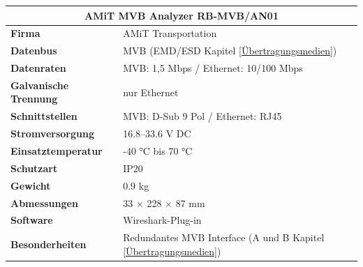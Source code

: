 \begin{minipage}{0.57\textwidth}
  \begin{tabular}{|m{3.3cm}|m{4.2cm}|}
  \hline
    \multicolumn{2}{|c|}{\textbf{AMiT MVB Analyzer RB-MVB/AN01}} \\ \hline
    \textbf{Firma} & AMiT Transportation \\ \hline
    \textbf{Datenbus} & MVB (EMD/ESD Kapitel \ref{Übertragungsmedien}) \\ \hline
    \textbf{Datenraten} & MVB: 1,5 Mbps / Ethernet: 10/100 Mbps \\ \hline
    \textbf{Galvanische \mbox{Trennung}} & nur Ethernet \\ \hline
    \textbf{Schnittstellen} & MVB: D-Sub 9 Pol / Ethernet: RJ45 \\ \hline
    \textbf{Stromversorgung} & 16.8–33.6 V DC \\ \hline
    \textbf{Einsatztemperatur} & -40 °C bis 70 °C \\ \hline
    \textbf{Schutzart} & IP20 \\ \hline
    \textbf{Gewicht} & 0.9 kg \\ \hline
    \textbf{Abmessungen} & 33 × 228 × 87 mm \\ \hline
    \textbf{Software} & Wireshark-Plug-in \\ \hline
    \textbf{Besonderheiten} & Redundantes MVB Interface (A und B Kapitel \ref{Übertragungsmedien}) \\ \hline
  \end{tabular}

\end{minipage}


